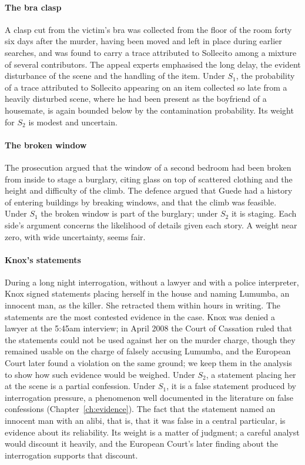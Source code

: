\paragraph{The bra clasp} A clasp cut from the victim's bra was collected from the floor of the room forty six days after the murder, having been moved and left in place during earlier searches, and was found to carry a trace attributed to Sollecito among a mixture of several contributors. The appeal experts emphasised the long delay, the evident disturbance of the scene and the handling of the item. Under $S_1$, the probability of a trace attributed to Sollecito appearing on an item collected so late from a heavily disturbed scene, where he had been present as the boyfriend of a housemate, is again bounded below by the contamination probability. Its weight for $S_2$ is modest and uncertain.

\paragraph{The broken window} The prosecution argued that the window of a second bedroom had been broken from inside to stage a burglary, citing glass on top of scattered clothing and the height and difficulty of the climb. The defence argued that Guede had a history of entering buildings by breaking windows, and that the climb was feasible. Under $S_1$ the broken window is part of the burglary; under $S_2$ it is staging. Each side's argument concerns the likelihood of details given each story. A weight near zero, with wide uncertainty, seems fair.

\paragraph{Knox's statements} During a long night interrogation, without a lawyer and with a police interpreter, Knox signed statements placing herself in the house and naming Lumumba, an innocent man, as the killer. She retracted them within hours in writing. The statements are the most contested evidence in the case. Knox was denied a lawyer at the 5:45am interview; in April 2008 the Court of Cassation ruled that the statements could not be used against her on the murder charge, though they remained usable on the charge of falsely accusing Lumumba, and the European Court later found a violation on the same ground; we keep them in the analysis to show how such evidence would be weighed. Under $S_2$, a statement placing her at the scene is a partial confession. Under $S_1$, it is a false statement produced by interrogation pressure, a phenomenon well documented in the literature on false confessions (Chapter~\ref{ch:evidence}). The fact that the statement named an innocent man with an alibi, that is, that it was false in a central particular, is evidence about its reliability. Its weight is a matter of judgment; a careful analyst would discount it heavily, and the European Court's later finding about the interrogation supports that discount.

